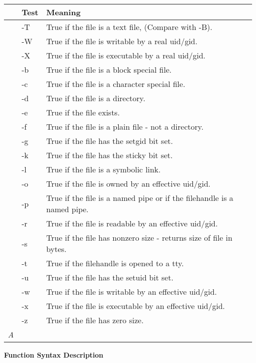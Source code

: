 \documentclass[a4paper,11pt]{book}
\begin{document}
\begin{tabular}{|p{0.2in}|p{0.4in}|p{3.5in}|} \hline 
 & \textbf{Test} & \textbf{Meaning} \\ \hline 
 & -T & True if the file is a text file, (Compare with -B). \\ \hline 
 & -W & True if the file is writable by a real uid/gid. \\ \hline 
 & -X & True if the file is executable by a real uid/gid. \\ \hline 
 & -b & True if the file is a block special file. \\ \hline 
 & -c & True if the file is a character special file. \\ \hline 
 & -d & True if the file is a directory. \\ \hline 
 & -e & True if the file exists. \\ \hline 
 & -f & True if the file is a plain file - not a directory. \\ \hline 
 & -g & True if the file has the setgid bit set. \\ \hline 
 & -k & True if the file has the sticky bit set. \\ \hline 
 & -l & True if the file is a symbolic link. \\ \hline 
 & -o & True if the file is owned by an effective uid/gid. \\ \hline 
 & -p & True if the file is a named pipe or if the filehandle is a named pipe. \\ \hline 
 & -r & True if the file is readable by an effective uid/gid. \\ \hline 
 & -s & True if the file has nonzero size - returns size of file in bytes. \\ \hline 
 & -t & True if the filehandle is opened to a tty. \\ \hline 
 & -u & True if the file has the setuid bit set. \\ \hline 
 & -w & True if the file is writable by an effective uid/gid. \\ \hline 
 & -x & True if the file is executable by an effective uid/gid. \\ \hline 
 & -z & True if the file has zero size. \\ \hline 
\newline \textit{A} &  &  \\ \hline 
\end{tabular}



\noindent \textbf{Function Syntax Description}
\end{document}

